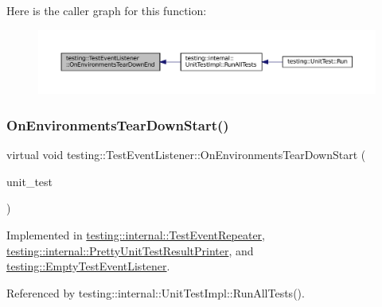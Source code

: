 Here is the caller graph for this function\+:
\nopagebreak
\begin{figure}[H]
\begin{center}
\leavevmode
\includegraphics[width=350pt]{classtesting_1_1TestEventListener_a9ea04fa7f447865ba76df35e12ba2092_icgraph}
\end{center}
\end{figure}
\mbox{\label{classtesting_1_1TestEventListener_a468b5e6701bcb86cb2c956caadbba5e4}} 
\subsubsection{\texorpdfstring{On\+Environments\+Tear\+Down\+Start()}{OnEnvironmentsTearDownStart()}}
{\footnotesize\ttfamily virtual void testing\+::\+Test\+Event\+Listener\+::\+On\+Environments\+Tear\+Down\+Start (\begin{DoxyParamCaption}\item[{const \hyperlink{classtesting_1_1UnitTest}{Unit\+Test} \&}]{unit\+\_\+test }\end{DoxyParamCaption})\hspace{0.3cm}{\ttfamily [pure virtual]}}



Implemented in \hyperlink{classtesting_1_1internal_1_1TestEventRepeater_a30db75df2d9a65d787f31e16004613c2}{testing\+::internal\+::\+Test\+Event\+Repeater}, \hyperlink{classtesting_1_1internal_1_1PrettyUnitTestResultPrinter_afea9dc849c92fdbc1d8505f4c74ffc1a}{testing\+::internal\+::\+Pretty\+Unit\+Test\+Result\+Printer}, and \hyperlink{classtesting_1_1EmptyTestEventListener_a00fa1a4ea5831e20746188414268e7c6}{testing\+::\+Empty\+Test\+Event\+Listener}.



Referenced by testing\+::internal\+::\+Unit\+Test\+Impl\+::\+Run\+All\+Tests().

